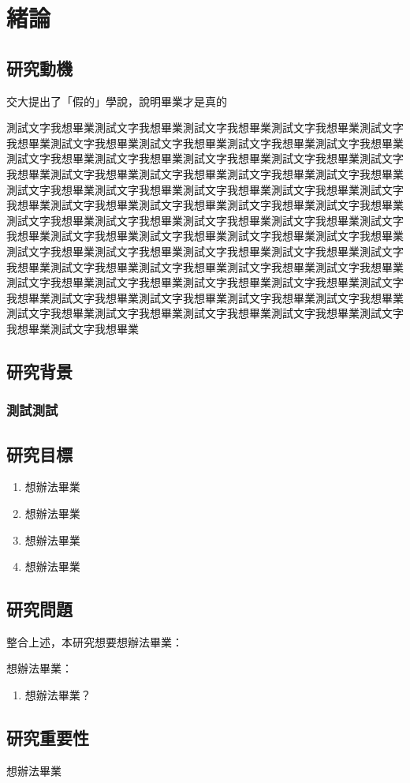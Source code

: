 \chapter{緒論}
\label{c:intro}
\section{研究動機}

交大\cite{test1999}提出了「假的」學說，說明畢業才是真的~\citep{test1999}

測試文字我想畢業測試文字我想畢業測試文字我想畢業測試文字我想畢業測試文字我想畢業測試文字我想畢業測試文字我想畢業測試文字我想畢業測試文字我想畢業測試文字我想畢業測試文字我想畢業測試文字我想畢業測試文字我想畢業測試文字我想畢業測試文字我想畢業測試文字我想畢業測試文字我想畢業測試文字我想畢業測試文字我想畢業測試文字我想畢業測試文字我想畢業測試文字我想畢業測試文字我想畢業測試文字我想畢業測試文字我想畢業測試文字我想畢業測試文字我想畢業測試文字我想畢業測試文字我想畢業測試文字我想畢業測試文字我想畢業測試文字我想畢業測試文字我想畢業測試文字我想畢業測試文字我想畢業測試文字我想畢業測試文字我想畢業測試文字我想畢業測試文字我想畢業測試文字我想畢業測試文字我想畢業測試文字我想畢業測試文字我想畢業測試文字我想畢業測試文字我想畢業測試文字我想畢業測試文字我想畢業測試文字我想畢業測試文字我想畢業測試文字我想畢業測試文字我想畢業測試文字我想畢業測試文字我想畢業測試文字我想畢業測試文字我想畢業測試文字我想畢業測試文字我想畢業測試文字我想畢業測試文字我想畢業測試文字我想畢業

\section{研究背景}
\subsection{測試測試}


\section{研究目標}
\begin{enumerate}
\item 想辦法畢業
\item 想辦法畢業
\item 想辦法畢業
\item 想辦法畢業
\end{enumerate}
\section{研究問題}
整合上述，本研究想要想辦法畢業：

\noindent
想辦法畢業：
\begin{enumerate}
\label{q1}
\item 想辦法畢業？
\end{enumerate}



\section{研究重要性} 
想辦法畢業


